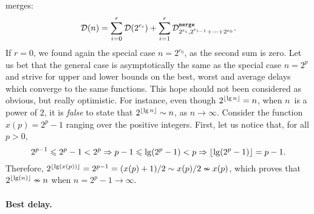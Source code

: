 merges:
\begin{equation}
\Dideal(n)
  = \sum_{i=0}^{r}{\Dideal(2^{e_i})}
    +
    \sum_{i=1}^{r}{\comp{merge}{2^{e_i},2^{e_{i-1}}+\dots+2^{e_0}}}.
\label{eq:msort_gen}
\end{equation}
If \(r=0\), we found again the special case \(n=2^{e_0}\), as the
second sum is zero. Let us bet that the general case is asymptotically
the same as the special case \(n=2^p\) and strive for upper and lower
bounds on the best, worst and average delays which converge to the
same functions. This hope should not been considered as obvious, but
really optimistic. For instance, even though \(2^{\lfloor{\lg n}\rfloor} =
n\), when \(n\)~is a power of \(2\), it is \emph{false} to state that
\(2^{\lfloor{\lg n}\rfloor} \mathrel{\sim} n\), as \(n \rightarrow \infty\).
Consider the function \(x(p)=2^p-1\) ranging over the positive
integers. First, let us notice that, for all \(p>0\),
\begin{equation*}
2^{p-1} \leqslant 2^p - 1 < 2^p \Rightarrow p-1 \leqslant \lg(2^p-1) <
p \Rightarrow \lfloor{\lg(2^p-1)}\rfloor = p-1.
\end{equation*}
Therefore, \(2^{\lfloor{\lg(x(p))}\rfloor} = 2^{p-1} = (x(p)+1)/2
\mathrel{\sim} x(p)/2 \mathrel{\nsim} x(p)\), which proves that
\(2^{\lfloor{\lg(n)}\rfloor} \nsim n\) when \(n=2^p-1 \rightarrow \infty\).

\medskip

\paragraph{Best delay.} 

